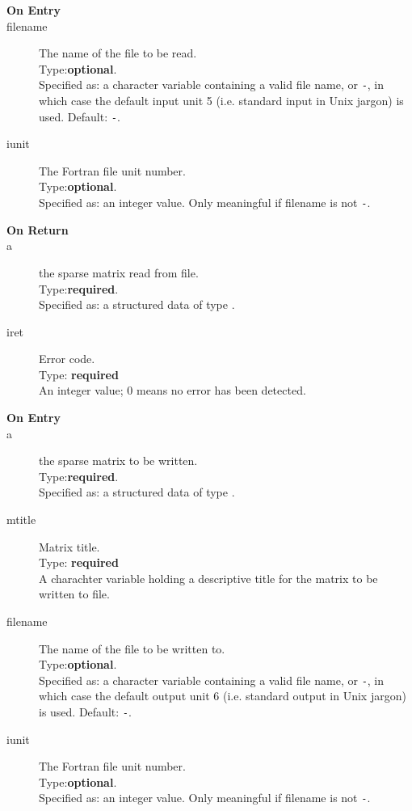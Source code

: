 
\begin{description}
\item[\bf  On Entry ]
\item[filename] The name of the file to be read.\\
Type:{\bf optional}.\\
Specified as: a character variable containing a valid file name, or
\verb|-|, in which case the default input unit  5 (i.e. standard input
in Unix jargon) is used. Default: \verb|-|. 
\item[iunit] The Fortran file unit number.\\
Type:{\bf optional}.\\
Specified as: an integer value. Only meaningful if filename is not \verb|-|.
\end{description}

\begin{description}
\item[\bf On Return]
\item[a] the sparse matrix read from file.\\
Type:{\bf required}.\\
Specified as: a structured data of type \spdata.
\item[iret] Error code.\\
Type: {\bf required} \\
An integer value; 0 means no error has been detected. 
\end{description}



\begin{description}
\item[\bf  On Entry ]
\item[a] the sparse matrix to be written.\\
Type:{\bf required}.\\
Specified as: a structured data of type \spdata.
\item[mtitle] Matrix title.\\
Type: {\bf required} \\
A charachter variable holding a descriptive title for the matrix to be
 written to file.
\item[filename] The name of the file to be written to.\\
Type:{\bf optional}.\\
Specified as: a character variable containing a valid file name, or
\verb|-|, in which case the default output unit  6 (i.e. standard output
in Unix jargon) is used. Default: \verb|-|. 
\item[iunit] The Fortran file unit number.\\
Type:{\bf optional}.\\
Specified as: an integer value. Only meaningful if filename is not \verb|-|.
\end{description}

